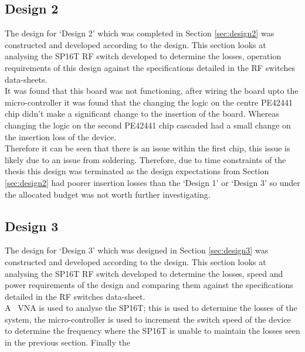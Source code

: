 \documentclass[12pt,openany,a4paper]{book}
\begin{document}
\subsection{Design 2}
The design for `Design 2' which was completed in Section \ref{sec:design2} was constructed and developed according to the design. This section looks at analysing the SP16T RF switch developed to determine the losses, operation requirements of this design against the specifications detailed in the RF switches data-sheets. \\[0.2cm]
It was found that this board was not functioning, after wiring the board upto the micro-controller it was found that the changing the logic on the centre PE42441 chip didn't make a significant change to the insertion of the board. Whereas changing the logic on the second PE42441 chip cascaded had a small change on the insertion loss of the device.
\\[0.2cm]
Therefore it can be seen that there is an issue within the first chip, this issue is likely due to an issue from soldering. Therefore, due to time constraints of the thesis this design was terminated as the design expectations from Section \ref{sec:design2} had poorer insertion losses than the `Design 1' or `Design 3' so under the allocated budget was not worth further investigating.   







\subsection{Design 3}
The design for `Design 3' which was designed in Section \ref{sec:design3} was constructed and developed according to the design. This section looks at analysing the SP16T RF switch developed to determine the losses, speed and power requirements of the design and comparing them against the specifications detailed in the RF switches data-sheet.\\
A \model \ VNA is used to analyse the SP16T; this is used to determine the losses of the system, the micro-controller is used to increment the switch speed of the device to determine the frequency where the SP16T is unable to maintain the losses seen in the previous section. Finally the 
 
\end{document}
